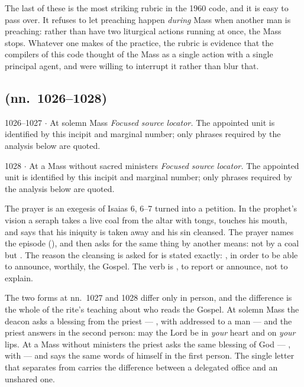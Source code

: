 The last of these is the most striking rubric in the 1960 code, and it is easy
to pass over. It refuses to let preaching happen \emph{during} Mass when
another man is preaching: rather than have two liturgical actions running at
once, the Mass stops. Whatever one makes of the practice, the rubric is
evidence that the compilers of this code thought of the Mass as a single
action with a single principal agent, and were willing to interrupt it rather
than blur that.

\subsection*{ (nn.~1026--1028)}

\begin{appointed}{1026--1027 $\cdot$ At solemn Mass}
\textit{Focused source locator.} The appointed unit is identified by this incipit and marginal number; only phrases required by the analysis below are quoted.
\end{appointed}

\begin{appointed}{1028 $\cdot$ At a Mass without sacred ministers}
\textit{Focused source locator.} The appointed unit is identified by this incipit and marginal number; only phrases required by the analysis below are quoted.
\end{appointed}

The prayer is an exegesis of Isaias 6, 6--7 turned into a petition. In the
prophet's vision a seraph takes a live coal from the altar with tongs, touches
his mouth, and says that his iniquity is taken away and his sin cleansed. The
prayer names the episode (), and then asks for the same thing by another means: not by a coal but
. The reason the cleansing is asked for is
stated exactly: , in
order to be able to announce, worthily, the Gospel. The verb is
, to report or announce, not to explain.

The two forms at nn.~1027 and 1028 differ only in person, and the difference is
the whole of the rite's teaching about who reads the Gospel. At solemn Mass the
deacon asks a blessing from the priest --- ,
with  addressed to a man --- and the priest answers in the
second person: may the Lord be in \emph{your} heart and on \emph{your} lips. At
a Mass without ministers the priest asks the same blessing of God ---
, with  --- and says the
same words of himself in the first person. The single letter that separates
 from  carries the difference between a
delegated office and an unshared one.


